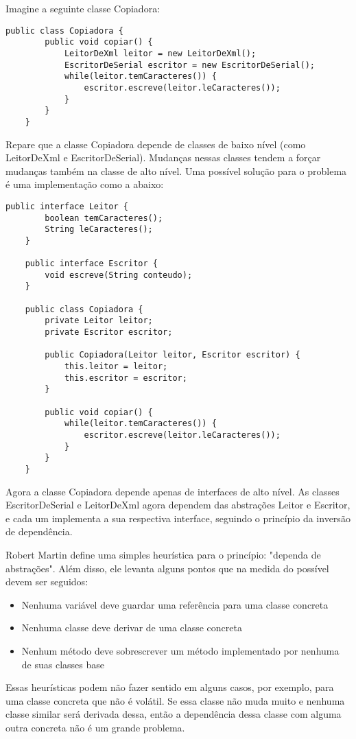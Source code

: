 Imagine a seguinte classe Copiadora:

\begin{lstlisting}[frame=trbl]
	public class Copiadora {
		public void copiar() {
			LeitorDeXml leitor = new LeitorDeXml();
			EscritorDeSerial escritor = new EscritorDeSerial();
			while(leitor.temCaracteres()) {
				escritor.escreve(leitor.leCaracteres());
			}
		}
	}
\end{lstlisting}

Repare que a classe Copiadora depende de classes de baixo nível (como LeitorDeXml e EscritorDeSerial). Mudanças nessas classes tendem a forçar
mudanças também na classe de alto nível. Uma possível solução para o problema é uma implementação como a abaixo:

\begin{lstlisting}[frame=trbl]
	public interface Leitor {
		boolean temCaracteres();
		String leCaracteres();
	}
	
	public interface Escritor {
		void escreve(String conteudo);
	}
	
	public class Copiadora {
		private Leitor leitor;
		private Escritor escritor;
		
		public Copiadora(Leitor leitor, Escritor escritor) {
			this.leitor = leitor;
			this.escritor = escritor;
		}
		
		public void copiar() {
			while(leitor.temCaracteres()) {
				escritor.escreve(leitor.leCaracteres());
			}
		}
	}
\end{lstlisting}

Agora a classe Copiadora depende apenas de interfaces de alto nível. As classes EscritorDeSerial e LeitorDeXml agora dependem das
abstrações Leitor e Escritor, e cada um implementa a sua respectiva interface, seguindo o princípio da inversão de dependência.

Robert Martin define uma simples heurística para o princípio: "dependa de abstrações". Além disso, ele levanta alguns pontos
que na medida do possível devem ser seguidos:

\begin{itemize}
	\item Nenhuma variável deve guardar uma referência para uma classe concreta
	\item Nenhuma classe deve derivar de uma classe concreta
	\item Nenhum método deve sobrescrever um método implementado por nenhuma de suas classes base
\end{itemize}

Essas heurísticas podem não fazer sentido em alguns casos, por exemplo, para uma classe concreta que não é volátil. Se essa classe
não muda muito e nenhuma classe similar será derivada dessa, então a dependência dessa classe com alguma outra concreta
não é um grande problema.

